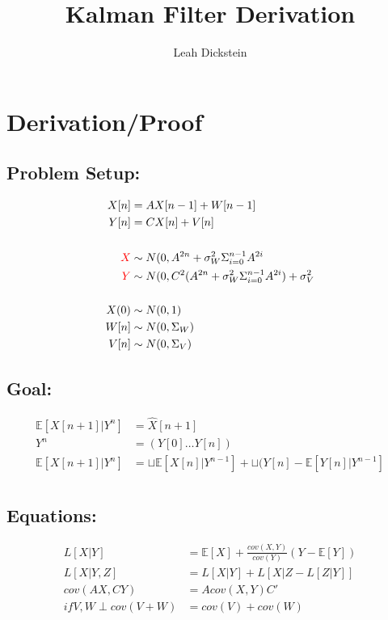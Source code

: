 \documentclass[leqno]{article}
\begin{document}
\title{Kalman Filter Derivation}
\author{Leah Dickstein}

\maketitle

\tableofcontents

\section{Derivation/Proof}

\subsection{Problem Setup:}
\begin{align*}
X[n] &= AX[n-1]+W[n-1]\\
Y[n] &= CX[n]+V[n]\\
\\
\textcolor{red}{X} &\sim N(0, A^{2n} + \sigma_W^2\Sigma_{i=0}^{n-1}A^{2i}\\
\textcolor{red}{Y} &\sim N(0, C^2(A^{2n} + \sigma_W^2\Sigma_{i=0}^{n-1}A^{2i}) + \sigma_V^2\\
\\
X(0) &\sim N(0,1)\\
W[n] &\sim N(0,\Sigma_W)\\
V[n] &\sim N(0,\Sigma_V)
\end{align*}

\subsection{Goal:}
\begin{align*}
\mathbb{E}[X[n+1]|Y^n] &= \hat{X}[n+1]\\
Y^n &= (Y[0] \dots Y[n])\\
\mathbb{E}[X[n+1]|Y^n] &= \sqcup\mathbb{E}[X[n]|Y^{n-1}] + \sqcup(Y[n] - \mathbb{E}[Y[n]|Y^{n-1}]  \\
\end{align*}

\subsection{Equations:}
\begin{align}
L[X|Y] &= \mathbb{E}[X] + \frac{cov(X,Y)}{cov(Y)}(Y-\mathbb{E}[Y])\\
L[X|Y,Z] &= L[X|Y] + L[X|Z-L[Z|Y]]\\
cov(AX,CY) &= Acov(X,Y)C'\\
if V,W \perp cov(V+W) &= cov(V) + cov(W)
\end{align}
\end{document}
